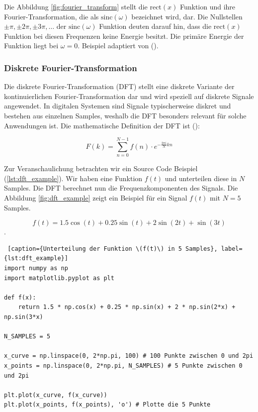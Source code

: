 \documentclass[11pt,a4paper]{article}
\begin{document}
\noindent
Die Abbildung \ref{fig:fourier_transform} stellt die \( \text{rect}(x) \) Funktion und ihre
Fourier-Transformation, die als \( \text{sinc}(\omega) \) bezeichnet wird, dar. Die Nullstellen
\( \pm \pi, \pm 2 \pi, \pm 3 \pi, \dots \) der \( \text{sinc}(\omega) \) Funktion deuten darauf
hin, dass die \( \text{rect}(x) \) Funktion bei diesen Frequenzen keine Energie besitzt. Die
primäre Energie der Funktion liegt bei \( \omega=0 \). Beispiel adaptiert von
(\cite[Chapter~5 - Example~5.1]{hansen2014fourier}).


\subsubsection{Diskrete Fourier-Transformation}

Die diskrete Fourier-Transformation (DFT) stellt eine diskrete Variante der kontinuierlichen
Fourier-Transformation dar und wird speziell auf diskrete Signale angewendet. In digitalen
Systemen sind Signale typischerweise diskret und bestehen aus einzelnen Samples, weshalb die DFT
besonders relevant für solche Anwendungen ist. Die mathematische Definition der DFT ist
(\cite[Chapter~3]{hansen2014fourier}):

\[
	F(k) = \sum_{n=0}^{N-1} f(n) \cdot e^{-\frac{2\pi i}{N} kn}
\]

\noindent \newline
Zur Veranschaulichung betrachten wir ein Source Code Beispiel (\ref{lst:dft_example}). 
Wir haben eine Funktion \(f(t)\) und unterteilen diese in \(N\) Samples. Die DFT berechnet nun die 
Frequenzkomponenten des Signals. Die Abbildung \ref{fig:dft_example} zeigt ein Beispiel für ein 
Signal \(f(t)\) mit \(N=5\) Samples.

\[ f(t) = 1.5 \cos(t) + 0.25 \sin(t) + 2 \sin(2t) + \sin(3t) \].

\begin{lstlisting} [caption={Unterteilung der Funktion \(f(t)\) in 5 Samples}, label={lst:dft_example}]
import numpy as np
import matplotlib.pyplot as plt

def f(x):
    return 1.5 * np.cos(x) + 0.25 * np.sin(x) + 2 * np.sin(2*x) + np.sin(3*x)

N_SAMPLES = 5

x_curve = np.linspace(0, 2*np.pi, 100) # 100 Punkte zwischen 0 und 2pi
x_points = np.linspace(0, 2*np.pi, N_SAMPLES) # 5 Punkte zwischen 0 und 2pi

plt.plot(x_curve, f(x_curve))
plt.plot(x_points, f(x_points), 'o') # Plotte die 5 Punkte
\end{lstlisting}
\end{document}
